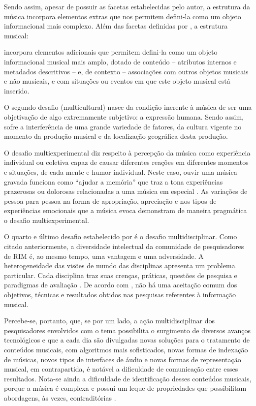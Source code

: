 Sendo assim, apesar de possuir as facetas estabelecidas pelo autor, a estrutura da música incorpora elementos extras que nos permitem defini-la como um objeto informacional mais complexo. Além das facetas definidas por , a estrutura musical:

\begin{citacao}
    [...] incorpora elementos adicionais que permitem defini-la como um objeto informacional musical mais amplo, dotado de conteúdo – atributos internos e metadados descritivos – e, de contexto – associações com outros objetos musicais e não musicais, e com situações ou eventos em que este objeto musical está inserido.
\end{citacao}

O segundo desafio (multicultural) nasce da condição inerente à música de ser uma objetivação de algo extremamente subjetivo: a expressão humana. Sendo assim, sofre a interferência de uma grande variedade de fatores, da cultura vigente no momento da produção musical e da localização geográfica desta produção.

O desafio multiexperimental diz respeito à percepção da música como experiência individual ou coletiva capaz de causar diferentes reações em diferentes momentos e situações, de cada mente e humor individual. Neste caso, ouvir uma música gravada funciona como “ajudar a memória” que traz a tona experiências prazerosas ou dolorosas relacionadas a uma música em especial \cite{downie2003,santini&souza2007}. As variações de pessoa para pessoa na forma de apropriação, apreciação e nos tipos de experiências emocionais que a música evoca demonstram de maneira pragmática o desafio multiexperimental.

O quarto e último desafio estabelecido por  é o desafio multidisciplinar. Como citado anteriormente, a diversidade intelectual da comunidade de pesquisadores de RIM é, ao mesmo tempo, uma vantagem e uma adversidade. A heterogeneidade das visões de mundo das disciplinas apresenta um problema particular. Cada disciplina traz suas crenças, práticas, questões de pesquisa e paradigmas de avaliação \cite{downie2003}. De acordo com , não há uma aceitação comum dos objetivos, técnicas e resultados obtidos nas pesquisas referentes à informação musical.

Percebe-se, portanto, que, se por um lado, a ação multidisciplinar dos pesquisadores envolvidos com o tema possibilita o surgimento de diversos avanços tecnológicos e que a cada dia são divulgadas novas soluções para o tratamento de conteúdos musicais, com algoritmos mais sofisticados, novas formas de indexação de músicas, novos tipos de interfaces de áudio e novas formas de representação musical, em contrapartida, é notável a dificuldade de comunicação entre esses resultados. Nota-se ainda a dificuldade de identificação desses conteúdos musicais, porque a música é complexa e possui um leque de propriedades que possibilitam abordagens, às vezes, contraditórias \cite{cruz2014}.

